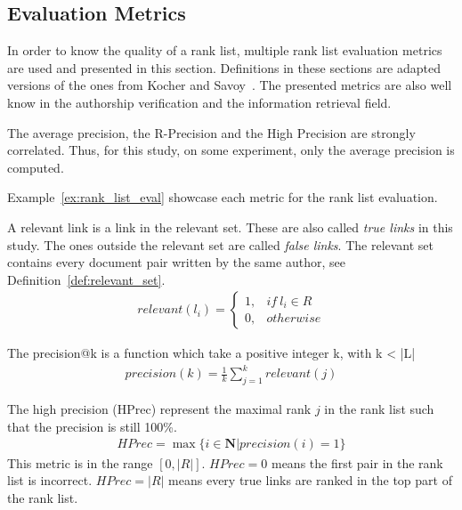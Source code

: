 \subsection{Evaluation Metrics \label{sec:rl_eval}}

In order to know the quality of a rank list, multiple rank list evaluation metrics are used and presented in this section.
Definitions in these sections are adapted versions of the ones from Kocher and Savoy~\cite{kocher_linking}.
The presented metrics are also well know in the authorship verification and the information retrieval field.

The average precision, the R-Precision and the High Precision are strongly correlated.
Thus, for this study, on some experiment, only the average precision is computed.

Example~\ref{ex:rank_list_eval} showcase each metric for the rank list evaluation.

\begin{definition}
  A relevant link is a link in the relevant set.
  These are also called \textit{true links} in this study.
  The ones outside the relevant set are called \textit{false links}.
  The relevant set contains every document pair written by the same author, see Definition~\ref{def:relevant_set}.
  \begin{gather*}
    relevant(l_i) =
    \begin{cases}
      1, & if\ l_i \in R \\
      0, & otherwise
    \end{cases}
  \end{gather*}

\end{definition}

\begin{definition}
  The precision@k is a function which take a positive integer k, with k < |L|
  \begin{gather*}
    precision(k) = \frac{1}{k} \sum_{j=1}^{k} relevant(j)
  \end{gather*}
\end{definition}

\begin{definition}
  The high precision (HPrec) represent the maximal rank $j$ in the rank list such that the precision is still 100\%.
  \begin{gather*}
    HPrec = \max\{i \in \mathbf{N} | precision(i) = 1\}
  \end{gather*}
  This metric is in the range $\left[0, |R|\right]$.
  $HPrec=0$ means the first pair in the rank list is incorrect.
  $HPrec=|R|$ means every true links are ranked in the top part of the rank list.
\end{definition}

